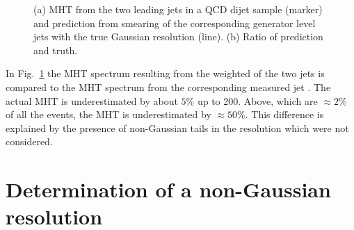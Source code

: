 \documentclass[a4paper]{cmspaper} %
\begin{document}
\begin{figure}[ht]
  \begin{center}
     
  \end{center}
  \caption{(a) MHT from the two leading jets in a QCD dijet sample (marker) and prediction from smearing of the corresponding generator level jets with the true Gaussian resolution (line).
    (b) Ratio of prediction and truth.}
\label{fig:resFit:qcd:mhtGauss}
\end{figure}

In Fig.~\ref{fig:resFit:qcd:mhtGauss} the MHT spectrum resulting from the weighted \ptgen of the two jets is compared to the MHT spectrum from the corresponding measured jet \pt.
The actual MHT is underestimated by about $5\%$ up to 200\gev.
Above, which are $\approx2\%$ of all the events, the MHT is underestimated by $\approx50\%$.
This difference is explained by the presence of non-Gaussian tails in the resolution which were not considered.



\section{Determination of a non-Gaussian resolution}
\end{document}
